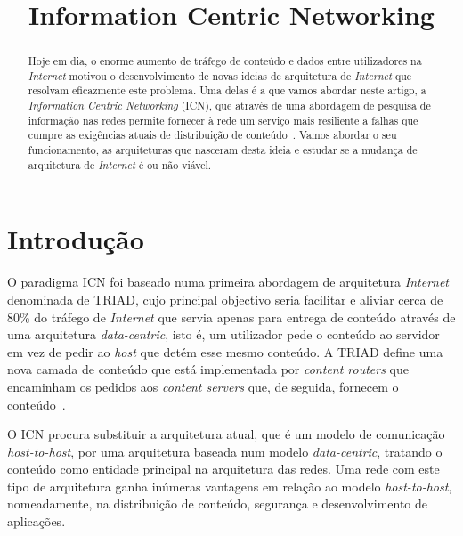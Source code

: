 \documentclass[conference]{IEEEtran}
\begin{document}
\title{Information Centric Networking}

\author{

}

\maketitle

\begin{abstract}
Hoje em dia, o enorme aumento de tr\'{a}fego de conte\'{u}do e dados entre utilizadores na \textit{Internet} motivou o desenvolvimento de novas ideias de arquitetura de \textit{Internet} que resolvam eficazmente este problema. Uma delas \'{e} a que vamos abordar neste artigo, a \textit{Information Centric Networking} (ICN), que atrav\'{e}s de uma abordagem de pesquisa de informa\c{c}\~{a}o nas redes permite fornecer \`{a} rede um servi\c{c}o mais resiliente a falhas que cumpre as exig\^{e}ncias atuais de distribui\c{c}\~{a}o de conte\'{u}do~\cite{ahlgren}. Vamos abordar o seu funcionamento, as arquiteturas que nasceram desta ideia e estudar se a mudan\c{c}a de arquitetura de \textit{Internet} \'{e} ou n\~{a}o vi\'{a}vel. 
\end{abstract}

\section{Introdu\c{c}\~{a}o}
O paradigma ICN foi baseado numa primeira abordagem de arquitetura \textit{Internet} denominada de TRIAD\cite{triad}, cujo principal objectivo seria facilitar e aliviar cerca de 80\% do tr\'{a}fego de \textit{Internet} que servia apenas para entrega de conte\'{u}do atrav\'{e}s de uma arquitetura \textit{data-centric}, isto \'{e}, um utilizador pede o conte\'{u}do ao servidor em vez de pedir ao \textit{host} que det\'{e}m esse mesmo conte\'{u}do\cite{ahlgren}. A TRIAD define uma nova camada de conte\'{u}do que est\'{a} implementada por \textit{content routers} que encaminham os pedidos aos \textit{content servers} que, de seguida, fornecem o conte\'{u}do~.

O ICN procura substituir a arquitetura atual, que \'{e} um modelo de comunica\c{c}\~{a}o \textit{host-to-host}, por uma arquitetura baseada num modelo \textit{data-centric}, tratando o conte\'{u}do como entidade principal na arquitetura das redes. Uma rede com este tipo de arquitetura ganha in\'{u}meras vantagens em rela\c{c}\~{a}o ao modelo \textit{host-to-host}, nomeadamente, na distribui\c{c}\~{a}o de conte\'{u}do, seguran\c{c}a e desenvolvimento de aplica\c{c}\~{o}es\cite{icn}.
\end{document}

